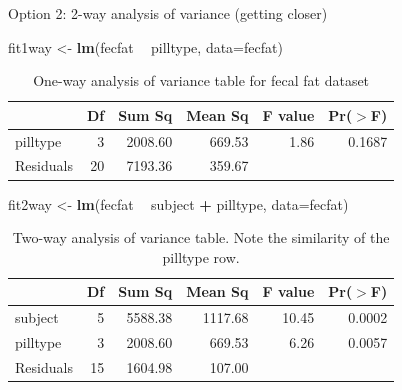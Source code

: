 \documentclass[
  ignorenonframetext,
]{beamer}
\newenvironment{Shaded}{\begin{snugshade}}{\end{snugshade}}
\newcommand{\DataTypeTok}[1]{\textcolor[rgb]{0.13,0.29,0.53}{#1}}
\newcommand{\KeywordTok}[1]{\textcolor[rgb]{0.13,0.29,0.53}{\textbf{#1}}}
\newcommand{\NormalTok}[1]{#1}
\newcommand{\OperatorTok}[1]{\textcolor[rgb]{0.81,0.36,0.00}{\textbf{#1}}}
\newcommand{\StringTok}[1]{\textcolor[rgb]{0.31,0.60,0.02}{#1}}
\begin{document}
\begin{frame}[fragile]{Option 2: 2-way analysis of variance (getting
closer)}
\protect\hypertarget{option-2-2-way-analysis-of-variance-getting-closer}{}

\footnotesize

\begin{Shaded}
\begin{Highlighting}[]
\NormalTok{fit1way <-}\StringTok{ }\KeywordTok{lm}\NormalTok{(fecfat }\OperatorTok{~}\StringTok{ }\NormalTok{pilltype, }\DataTypeTok{data=}\NormalTok{fecfat)}
\end{Highlighting}
\end{Shaded}

\begin{table}[ht]
\centering
\begin{tabular}{lrrrrr}
  \hline
 & Df & Sum Sq & Mean Sq & F value & Pr($>$F) \\ 
  \hline
pilltype & 3 & 2008.60 & 669.53 & 1.86 & 0.1687 \\ 
  Residuals & 20 & 7193.36 & 359.67 &  &  \\ 
   \hline
\end{tabular}
\caption{One-way analysis of variance table for fecal fat dataset} 
\end{table}

\begin{Shaded}
\begin{Highlighting}[]
\NormalTok{fit2way <-}\StringTok{ }\KeywordTok{lm}\NormalTok{(fecfat }\OperatorTok{~}\StringTok{ }\NormalTok{subject }\OperatorTok{+}\StringTok{ }\NormalTok{pilltype, }\DataTypeTok{data=}\NormalTok{fecfat)}
\end{Highlighting}
\end{Shaded}

\begin{table}[ht]
\centering
\begin{tabular}{lrrrrr}
  \hline
 & Df & Sum Sq & Mean Sq & F value & Pr($>$F) \\ 
  \hline
subject & 5 & 5588.38 & 1117.68 & 10.45 & 0.0002 \\ 
  pilltype & 3 & 2008.60 & 669.53 & 6.26 & 0.0057 \\ 
  Residuals & 15 & 1604.98 & 107.00 &  &  \\ 
   \hline
\end{tabular}
\caption{Two-way analysis of variance table. Note the similarity of the pilltype row.} 
\label{2}
\end{table}

\end{frame}
\end{document}
